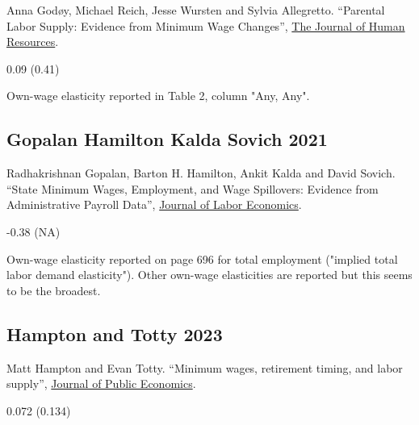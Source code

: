 \noindent Anna Godøy, Michael Reich, Jesse Wursten and Sylvia Allegretto. ``Parental Labor Supply: Evidence from Minimum Wage Changes'', \href{https://doi.org/10.3368/jhr.1119-10540R2}{The Journal of Human Resources}.

\vspace{0.7em}

 0.09 (0.41)

\vspace{0.7em}

 Own-wage elasticity reported in Table 2, column "Any, Any".

\subsection*{Gopalan Hamilton Kalda Sovich 2021}
\vspace{-0.7em}

\noindent Radhakrishnan Gopalan, Barton H. Hamilton, Ankit Kalda and David Sovich. ``State Minimum Wages, Employment, and Wage Spillovers: Evidence from Administrative Payroll Data'', \href{https://doi.org/10.1086/711355}{Journal of Labor Economics}.

\vspace{0.7em}

 -0.38 (NA)

\vspace{0.7em}

 Own-wage elasticity reported on page 696 for total employment ("implied total labor demand elasticity"). Other own-wage elasticities are reported but this seems to be the broadest.

\subsection*{Hampton and Totty 2023}
\vspace{-0.7em}

\noindent Matt Hampton and Evan Totty. ``Minimum wages, retirement timing, and labor supply'', \href{https://doi.org/10.1016/j.jpubeco.2023.104924}{Journal of Public Economics}.

\vspace{0.7em}

 0.072 (0.134)

\vspace{0.7em}

